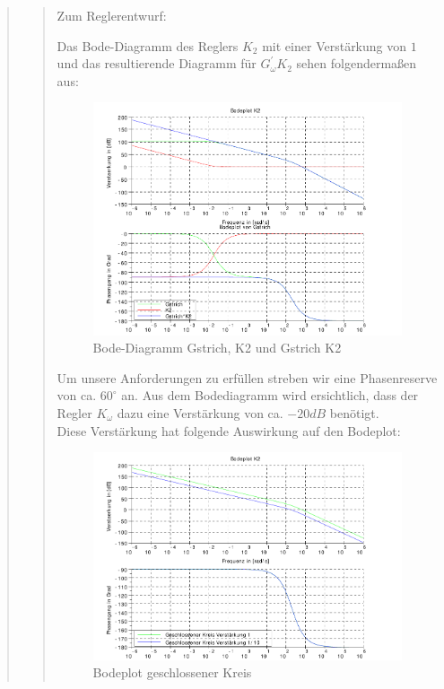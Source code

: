 \begin{quote}
\begin{quote}
		
		Zum Reglerentwurf:\vspace{1em}
		
		Das Bode-Diagramm des Reglers $K_2$ mit einer Verstärkung von $1$ und das resultierende Diagramm für $G_\omega^{'}
		K_2$ sehen folgendermaßen aus:
		\begin{figure}[H]
        \centering
            \includegraphics[scale=0.7, trim = 0cm 0cm 0cm 0cm, clip]{./Bilder/K2GstrichVersion1verstaerkung1}
                \caption{Bode-Diagramm Gstrich, K2 und Gstrich K2}
        \end{figure}
    
        Um unsere Anforderungen zu erfüllen streben wir eine Phasenreserve von ca. $60^{\circ}$ an. Aus dem Bodediagramm
        wird ersichtlich, dass der Regler $K_\omega$ dazu eine Verstärkung von ca. $-20dB$ benötigt.\\
        Diese Verstärkung hat folgende Auswirkung auf den Bodeplot:
        \begin{figure}[H]
        \centering
            \includegraphics[scale=0.7, trim = 0cm 0cm 0cm 0cm, clip]{./Bilder/BodeGschlossenverstaerkt}
                \caption{Bodeplot geschlossener Kreis}
        \end{figure}
    

\end{quote}
\end{quote}
